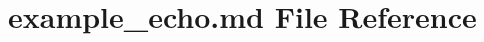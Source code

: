 \hypertarget{example__echo_8md}{\section{example\-\_\-echo.\-md File Reference}
\label{example__echo_8md}
}
